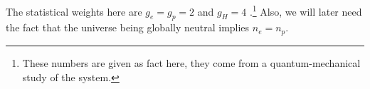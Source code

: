 \documentclass[main.tex]{subfiles}
\begin{document}
The statistical weights here are \(g_e = g_p = 2\) and \(g_H = 4\) \cite[pag.\ 194]{LucchinColes:2002}.\footnote{These numbers are given as fact here, they come from a quantum-mechanical study of the system.}
Also, we will later need the fact that the universe being globally neutral implies \(n_e = n_p\). 



\end{document}
